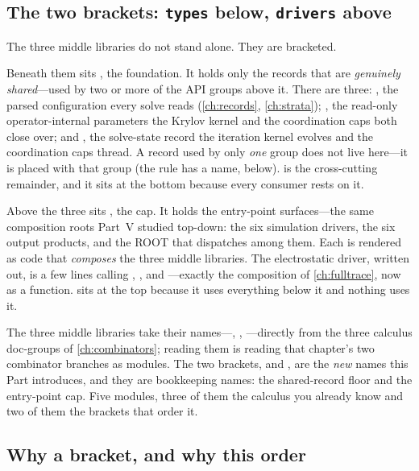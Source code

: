 \subsection{The two brackets: \texttt{types} below, \texttt{drivers} above}

The three middle libraries do not stand alone. They are bracketed.

Beneath them sits , the foundation. It holds only the records that are
\emph{genuinely shared}---used by two or more of the API groups above it. There are
three: , the parsed configuration every solve reads (\cref{ch:records},
\cref{ch:strata}); , the read-only operator-internal parameters the
Krylov kernel and the coordination caps both close over; and , the
solve-state record the iteration kernel evolves and the coordination caps thread.
A record used by only \emph{one} group does not live here---it is placed with that
group (the rule has a name, below).  is the cross-cutting remainder,
and it sits at the bottom because every consumer rests on it.

Above the three sits , the cap. It holds the entry-point
surfaces---the same composition roots Part~V studied top-down: the six simulation
drivers, the six output products, and the  ROOT that dispatches
among them. Each is rendered as code that \emph{composes} the three middle
libraries. The electrostatic driver, written out, is a few lines calling
, , and ---exactly the
composition of \cref{ch:fulltrace}, now as a function.  sits at the
top because it uses everything below it and nothing uses it.

\begin{notationbox}
The three middle libraries take their names---,
, ---directly from the three calculus
doc-groups of \cref{ch:combinators}; reading them is reading that chapter's two
combinator branches as modules. The two brackets,  and ,
are the \emph{new} names this Part introduces, and they are bookkeeping names: the
shared-record floor and the entry-point cap. Five modules, three of them the
calculus you already know and two of them the brackets that order it.
\end{notationbox}

\subsection{Why a bracket, and why this order}


